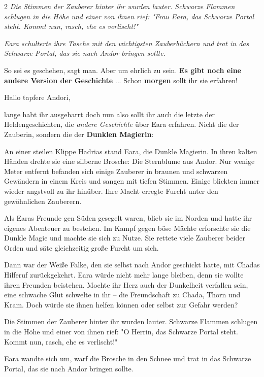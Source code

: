 \documentclass[10pt, a4paper, oneside]{book}
\begin{document}
\begin{multicols}{2}
\textit{Die Stimmen der Zauberer hinter ihr wurden lauter. Schwarze Flammen schlugen in die Höhe und einer von ihnen rief: "Frau Eara, das Schwarze Portal steht. Kommt nun, rasch, ehe es verlischt!"}

\textit{Eara schulterte ihre Tasche mit den wichtigsten Zauberbüchern und trat in das Schwarze Portal, das sie nach Andor bringen sollte.}


So sei es geschehen, sagt man. Aber um ehrlich zu sein. \textbf{Es gibt noch eine andere Version der Geschichte} ... Schon \textbf{morgen} sollt ihr sie erfahren!\bigskip

Hallo tapfere Andori,

lange habt ihr ausgeharrt doch nun also sollt ihr auch die letzte der Heldengeschichten, die \textit{andere Geschichte} über Eara erfahren. Nicht die der Zauberin, sondern die der \textbf{Dunklen Magierin}:



An einer steilen Klippe Hadrias stand Eara, die Dunkle Magierin. In ihren kalten Händen drehte sie eine silberne Brosche: Die Sternblume aus Andor. Nur wenige Meter entfernt befanden sich einige Zauberer in braunen und schwarzen Gewändern in einem Kreis und sangen mit tiefen Stimmen. Einige blickten immer wieder angstvoll zu ihr hinüber. Ihre Macht erregte Furcht unter den gewöhnlichen Zauberern.

Als Earas Freunde gen Süden gesegelt waren, blieb sie im Norden und hatte ihr eigenes Abenteuer zu bestehen. Im Kampf gegen böse Mächte erforschte sie die Dunkle Magie und machte sie sich zu Nutze. Sie rettete viele Zauberer beider Orden und säte gleichzeitig große Furcht um sich.

Dann war der Weiße Falke, den sie selbst nach Andor geschickt hatte, mit Chadas Hilferuf zurückgekehrt. Eara würde nicht mehr lange bleiben, denn sie wollte ihren Freunden beistehen. Mochte ihr Herz auch der Dunkelheit verfallen sein, eine schwache Glut schwelte in ihr – die Freundschaft zu Chada, Thorn und Kram. Doch würde sie ihnen helfen können oder selbst zur Gefahr werden?

Die Stimmen der Zauberer hinter ihr wurden lauter. Schwarze Flammen schlugen in die Höhe und einer von ihnen rief: "O Herrin, das Schwarze Portal steht. Kommt nun, rasch, ehe es verlischt!"

Eara wandte sich um, warf die Brosche in den Schnee und trat in das Schwarze Portal, das sie nach Andor bringen sollte.






\end{multicols}
\end{document}
